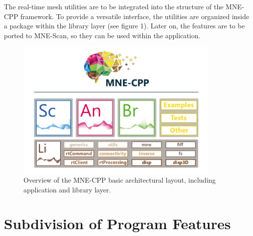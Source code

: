 The real-time mesh utilities are to be integrated into the structure of the MNE-CPP framework. To provide a versatile interface, the utilities are organized inside a package within the library layer (see figure 1). Later on, the features are to be ported to MNE-Scan, so they can be used within the application.
\begin{figure}[h]
	\begin{center}
		\includegraphics[width=10cm]{figures/mne_architecture.png}
		\caption{Overview of the MNE-CPP basic architectural layout, including application and library layer.}
	\end{center}
\end{figure}

\clearpage

\section{Subdivision of Program Features}

